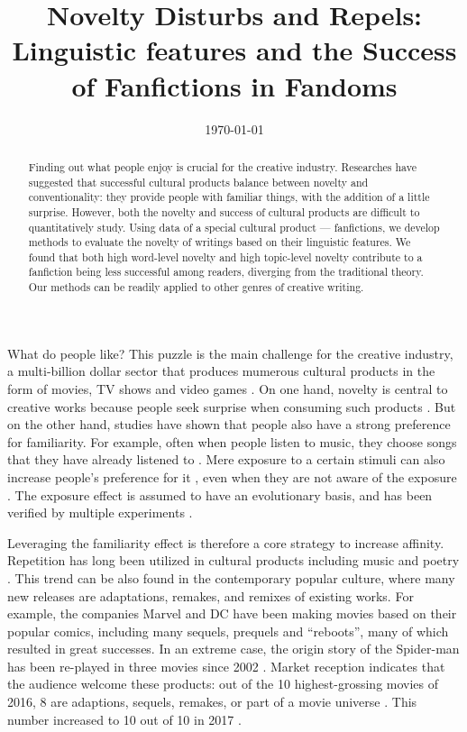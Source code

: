 \documentclass[a4paper]{article}
\begin{document}

\title{Novelty Disturbs and Repels: Linguistic features and the Success of Fanfictions in Fandoms} %
\date{\today}
\maketitle %

\begin{abstract}
Finding out what people enjoy is crucial for the creative industry. Researches have suggested that successful cultural products balance between novelty and conventionality: they provide people with familiar things, with the addition of a little surprise. However, both the novelty and success of cultural products are difficult to quantitatively study. Using data of a special cultural product --- fanfictions, we develop methods to evaluate the novelty of writings based on their linguistic features. We found that both high word-level novelty and high topic-level novelty contribute to a fanfiction being less successful among readers, diverging from the traditional theory. Our methods can be readily applied to other genres of creative writing.
\end{abstract}

What do people like? This puzzle is the main challenge for the creative industry, a multi-billion dollar sector that produces mumerous cultural products in the form of movies, TV shows and video games \cite{creativeindustries}. On one hand, novelty is central to creative works because people seek surprise when consuming such products \cite{hutter2011infinite}. But on the other hand, studies have shown that people also have a strong preference for familiarity. For example, often when people listen to music, they choose songs that they have already listened to \cite{thompson2014shazam}. Mere exposure to a certain stimuli can also increase people's preference for it \cite{zajonc1968attitudinal}, even when they are not aware of the exposure \cite{kunst1980affective}. The exposure effect is assumed to have an evolutionary basis, and has been verified by multiple experiments \cite{bornstein1989exposure}.

Leveraging the familiarity effect is therefore a core strategy to increase affinity. Repetition has long been utilized in cultural products including music and poetry \cite{huron2013psychological}. This trend can be also found in the contemporary popular culture, where many new releases are adaptations, remakes, and remixes \cite{manovich2007comes} of existing works. For example, the companies Marvel and DC have been making movies based on their popular comics, including many sequels, prequels and ``reboots'', many of which resulted in great successes. In an extreme case, the origin story of the Spider-man has been re-played in three movies since 2002 \cite{spiderman}. Market reception indicates that the audience welcome these products: out of the 10 highest-grossing movies of 2016, 8 are adaptions, sequels, remakes, or part of a movie universe \cite{2016film}. This number increased to 10 out of 10 in 2017 \cite{2017film}. 
\end{document}

